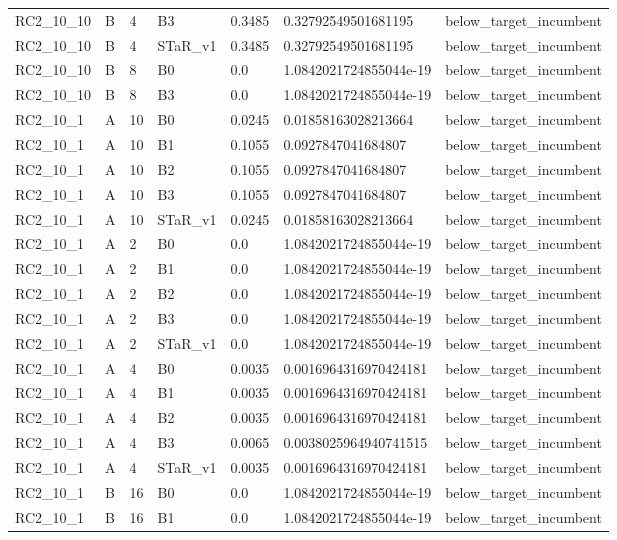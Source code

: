 \begin{tabular}{lllllll}
 RC2\_10\_10 & B & 4 & B3 & 0.3485 & 0.32792549501681195 & below\_target\_incumbent \\
 RC2\_10\_10 & B & 4 & STaR\_v1 & 0.3485 & 0.32792549501681195 & below\_target\_incumbent \\
 RC2\_10\_10 & B & 8 & B0 & 0.0 & 1.0842021724855044e-19 & below\_target\_incumbent \\
 RC2\_10\_10 & B & 8 & B3 & 0.0 & 1.0842021724855044e-19 & below\_target\_incumbent \\
 RC2\_10\_1 & A & 10 & B0 & 0.0245 & 0.01858163028213664 & below\_target\_incumbent \\
 RC2\_10\_1 & A & 10 & B1 & 0.1055 & 0.0927847041684807 & below\_target\_incumbent \\
 RC2\_10\_1 & A & 10 & B2 & 0.1055 & 0.0927847041684807 & below\_target\_incumbent \\
 RC2\_10\_1 & A & 10 & B3 & 0.1055 & 0.0927847041684807 & below\_target\_incumbent \\
 RC2\_10\_1 & A & 10 & STaR\_v1 & 0.0245 & 0.01858163028213664 & below\_target\_incumbent \\
 RC2\_10\_1 & A & 2 & B0 & 0.0 & 1.0842021724855044e-19 & below\_target\_incumbent \\
 RC2\_10\_1 & A & 2 & B1 & 0.0 & 1.0842021724855044e-19 & below\_target\_incumbent \\
 RC2\_10\_1 & A & 2 & B2 & 0.0 & 1.0842021724855044e-19 & below\_target\_incumbent \\
 RC2\_10\_1 & A & 2 & B3 & 0.0 & 1.0842021724855044e-19 & below\_target\_incumbent \\
 RC2\_10\_1 & A & 2 & STaR\_v1 & 0.0 & 1.0842021724855044e-19 & below\_target\_incumbent \\
 RC2\_10\_1 & A & 4 & B0 & 0.0035 & 0.0016964316970424181 & below\_target\_incumbent \\
 RC2\_10\_1 & A & 4 & B1 & 0.0035 & 0.0016964316970424181 & below\_target\_incumbent \\
 RC2\_10\_1 & A & 4 & B2 & 0.0035 & 0.0016964316970424181 & below\_target\_incumbent \\
 RC2\_10\_1 & A & 4 & B3 & 0.0065 & 0.0038025964940741515 & below\_target\_incumbent \\
 RC2\_10\_1 & A & 4 & STaR\_v1 & 0.0035 & 0.0016964316970424181 & below\_target\_incumbent \\
 RC2\_10\_1 & B & 16 & B0 & 0.0 & 1.0842021724855044e-19 & below\_target\_incumbent \\
 RC2\_10\_1 & B & 16 & B1 & 0.0 & 1.0842021724855044e-19 & below\_target\_incumbent \\

\end{tabular}
